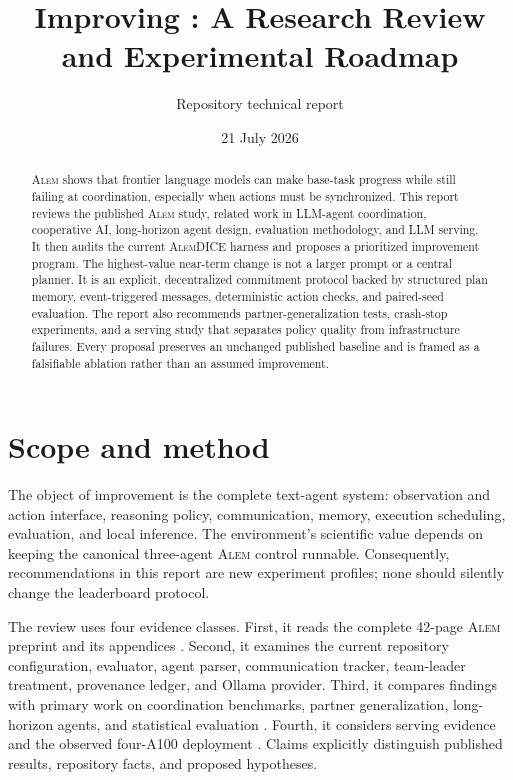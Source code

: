 \documentclass[11pt]{article}
\title{Improving \dice{}: A Research Review and Experimental Roadmap}
\author{Repository technical report}
\date{21 July 2026}
\newcommand{\alem}{\textsc{Alem}}
\newcommand{\dice}{\textsc{AlemDICE}}
\begin{document}
\maketitle

\begin{abstract}
\alem{} shows that frontier language models can make base-task progress while still failing at
coordination, especially when actions must be synchronized.  This report reviews the published
\alem{} study, related work in LLM-agent coordination, cooperative AI, long-horizon agent design,
evaluation methodology, and LLM serving.  It then audits the current \dice{} harness and proposes a
prioritized improvement program.  The highest-value near-term change is not a larger prompt or a
central planner.  It is an explicit, decentralized commitment protocol backed by structured plan
memory, event-triggered messages, deterministic action checks, and paired-seed evaluation.  The
report also recommends partner-generalization tests, crash-stop experiments, and a serving study
that separates policy quality from infrastructure failures.  Every proposal preserves an unchanged
published baseline and is framed as a falsifiable ablation rather than an assumed improvement.
\end{abstract}

\section{Scope and method}

The object of improvement is the complete text-agent system: observation and action interface,
reasoning policy, communication, memory, execution scheduling, evaluation, and local inference.
The environment's scientific value depends on keeping the canonical three-agent \alem{} control
runnable.  Consequently, recommendations in this report are new experiment profiles; none should
silently change the leaderboard protocol.

The review uses four evidence classes.  First, it reads the complete 42-page \alem{} preprint and its
appendices \cite{alem2026}.  Second, it examines the current repository configuration, evaluator,
agent parser, communication tracker, team-leader treatment, provenance ledger, and Ollama provider.
Third, it compares findings with primary work on coordination benchmarks, partner generalization,
long-horizon agents, and statistical evaluation
\cite{agashe2025coordination,zhu2025multiagentbench,sun2025collab,leibo2021meltingpot,agarwal2021precipice}.
Fourth, it considers serving evidence and the observed four-A100 deployment
\cite{kwon2023vllm,ollamafaq,ollamacontext}.  Claims explicitly distinguish published results,
repository facts, and proposed hypotheses.
\end{document}
